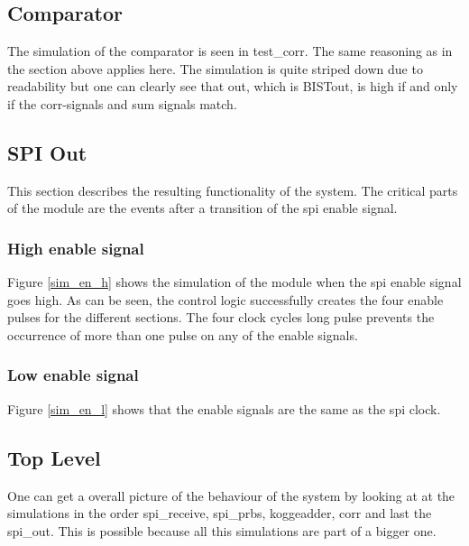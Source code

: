 \subsection{Comparator}
The simulation of the comparator is seen in test\_corr. The same reasoning as in the section above applies here. The simulation is quite striped down due to readability but one can clearly see that out, which is BISTout, is high if and only if the corr-signals and sum signals match.

\subsection{SPI Out}
This section describes the resulting functionality of the system. The critical parts of the module are the events after a transition of the spi enable signal.
\subsubsection{High enable signal}
Figure \ref{sim_en_h} shows the simulation of the module when the spi enable signal goes high. As can be seen, the control logic successfully creates the four enable pulses for the different sections. The four clock cycles long pulse prevents the occurrence of more than one pulse on any of the enable signals. 




\subsubsection{Low enable signal}
Figure \ref{sim_en_l} shows that the enable signals are the same as the spi clock.


\subsection{Top Level}
One can get a overall picture of the behaviour of the system by looking at at the simulations in the order spi\_receive, spi\_prbs, koggeadder, corr and last the spi\_out. This is possible because all this simulations are part of a bigger one.
